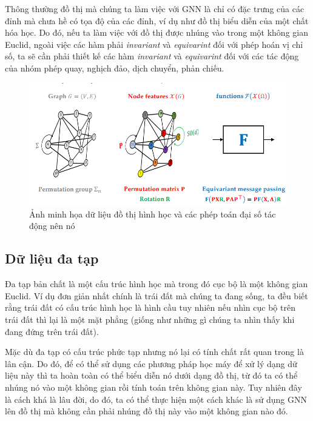 Thông thường đồ thị mà chúng ta làm việc với GNN là chỉ có đặc trưng của các đỉnh mà chưa hề có tọa độ của các đỉnh, ví dụ như đồ thị biểu diễn của một chất hóa học. Do đó, nếu ta làm việc với đồ thị được nhúng vào trong một không gian Euclid, ngoài việc các hàm phải \textit{invariant} và \textit{equivarint} đối với phép hoán vị chỉ số, ta sẽ cần phải thiết kế các hàm \textit{invariant} và \textit{equivarint} đối với các tác động của nhóm phép quay, nghịch đảo, dịch chuyển, phản chiếu\cite{geometricdeep2022}.

\begin{figure}[H]
    \centering
    \captionsetup{justification=centering}
    \includegraphics[width=1\linewidth]{Images/GDL/graph/gnn_geometric.png}
    \caption{Ảnh minh họa dữ liệu đồ thị hình học và các phép toán đại số tác động nên nó\cite{geometricdeep2022}}
\end{figure}


\subsection{Dữ liệu đa tạp}
Đa tạp\cite{wikipedia-datap} bản chất là một cấu trúc hình học mà trong đó cục bộ là một không gian Euclid. Ví dụ đơn giản nhất chính là trái đất mà chúng ta đang sống, ta đều biết rằng trái đất có cấu trúc hình học là hình cầu tuy nhiên nếu nhìn cục bộ trên trái đất thì lại là một mặt phẳng (giống như những gì chúng ta nhìn thấy khi đang đứng trên trái đất).

Mặc dù đa tạp có cấu trúc phức tạp nhưng nó lại có tính chất rất quan trong là lân cận. Do đó, để có thể sử dụng các phương pháp học máy để xử lý dạng dữ liệu này thì ta hoàn toàn có thể biểu diễn nó dưới dạng đồ thị, từ đó ta có thể nhúng nó vào một không gian rồi tính toán trên không gian này\cite{geometricdeep2022}. Tuy nhiên đây là cách khá là lâu đời, do đó, ta có thể thực hiện một cách khác là sử dụng GNN lên đồ thị mà không cần phải nhúng đồ thị này vào một không gian nào đó\cite{geometricdeep2022}.

